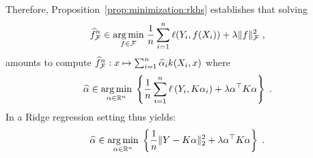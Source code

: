 Therefore, Proposition~\ref{prop:minimization:rkhs} establishes that  solving 
\[
\widehat f^n_{\calF} \in \underset{f\in\calF}{\argmin}\;\frac{1}{n}\sum_{i=1}^n \ell(Y_i,f(X_i)) + \lambda\|f\|_\calF^2\eqsp,
\]
amounts to compute  $\widehat f^n_{\mathcal{F}} : x \mapsto \sum_{i=1}^n \widehat \alpha_i k(X_i,x)$ where
\[
\widehat\alpha \in \underset{\alpha \in \rset^n}{\argmin}\;\left\{\frac{1}{n}\sum_{i=1}^n \ell\left(Y_i,K\alpha_i\right) + \lambda \alpha^\top K \alpha\right\}\eqsp.
\]
In a Ridge regression setting thus yields:
\[
\widehat\alpha \in \underset{\alpha \in \rset^n}{\argmin}\;\left\{\frac{1}{n} \|Y-K\alpha\|_2^2+ \lambda \alpha^\top K \alpha\right\}\eqsp.
\]